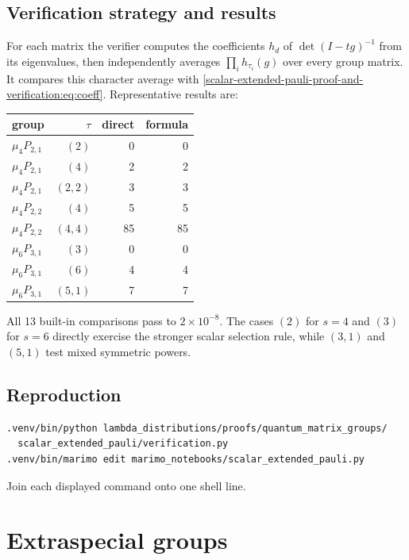 \documentclass[10pt]{article}
\newcommand{\SMG}{\operatorname{SMG}}
\begin{document}
\subsection{Verification strategy and results}
For each matrix the verifier computes the coefficients $h_d$ of
$\det(I-tg)^{-1}$ from its eigenvalues, then independently averages
$\prod_i h_{\tau_i}(g)$ over every group matrix.  It compares this character
average with \eqref{scalar-extended-pauli-proof-and-verification:eq:coeff}.  Representative results are:
\begin{center}
\begin{tabular}{@{}lrrr@{}}\toprule
group & $\tau$ & direct & formula\\\midrule
$\mu_4P_{2,1}$ & $(2)$&0&0\\
$\mu_4P_{2,1}$ & $(4)$&2&2\\
$\mu_4P_{2,1}$ & $(2,2)$&3&3\\
$\mu_4P_{2,2}$ & $(4)$&5&5\\
$\mu_4P_{2,2}$ & $(4,4)$&85&85\\
$\mu_6P_{3,1}$ & $(3)$&0&0\\
$\mu_6P_{3,1}$ & $(6)$&4&4\\
$\mu_6P_{3,1}$ & $(5,1)$&7&7\\\bottomrule
\end{tabular}
\end{center}
All 13 built-in comparisons pass to $2\times10^{-8}$.  The cases $(2)$ for
$s=4$ and $(3)$ for $s=6$ directly exercise the stronger scalar selection
rule, while $(3,1)$ and $(5,1)$ test mixed symmetric powers.

\subsection{Reproduction}
\begin{verbatim}
.venv/bin/python lambda_distributions/proofs/quantum_matrix_groups/
  scalar_extended_pauli/verification.py
.venv/bin/marimo edit marimo_notebooks/scalar_extended_pauli.py
\end{verbatim}
Join each displayed command onto one shell line.
\endgroup


\clearpage
\section{Extraspecial groups}\label{proof:extraspecial}
\begingroup
{}
\providecommand{\Sgm}{\SMG}
\renewcommand{\Sgm}{\SMG}
\setcounter{theorem}{0}
\setcounter{proposition}{0}
\setcounter{lemma}{0}
\setcounter{corollary}{0}
\setcounter{remark}{0}
\begin{abstract}
We verify the proposed spectral formulas on all matrices of the two
extraspecial groups of order $3^3$ and on the faithful representations of
$D_8$ and $Q_8$.  These examples are minimal but discriminating: they detect
both the exponent-$p$ versus exponent-$p^2$ split and the plus/minus Arf type.
All 20 coefficient comparisons pass.
\end{abstract}
\end{document}
